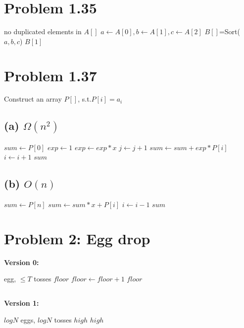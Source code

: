 \documentclass[a4paper]{article}
\begin{document}
\begin{spacing}{1.3}
\begin{multicols}{2}
\section*{Problem 1.35}
\begin{algorithmic}[1]
\ENSURE no duplicated elements in $A[]$
\STATE $a \leftarrow A[0], b\leftarrow A[1], c\leftarrow A[2]$
\STATE $B[]$=Sort($a,b,c$)
\RETURN $B[1]$
\end{algorithmic}

\section*{Problem 1.37}
Construct an array $P[]$, s.t.$P[i]=a_i$
\subsection*{(a) $\Omega(n^2)$}
\begin{algorithmic}[1]
\STATE $sum \gets P[0]$
\STATE $exp \gets 1$
{
\STATE $exp \gets exp*x$
\STATE $j\gets j+1$
\ENDFOR}
\STATE $sum\gets sum+exp*P[i]$
\STATE $i\gets i+1$
\ENDFOR
\RETURN $sum$
\end{algorithmic}

\subsection*{(b) $O(n)$}
\begin{algorithmic}[1]
\STATE $sum \gets P[n]$
\STATE $sum\gets sum*x+P[i]$
\STATE $i\gets i-1$
\ENDFOR
\RETURN $sum$
\end{algorithmic}

\section*{}
\section*{Problem 2: Egg drop}
\textbf{Version 0:}
\begin{algorithmic}[1]
 egg, $\leq T$ tosses
 \RETURN $floor$ \ENDIF
\STATE $floor \gets floor+1$
\ENDFOR
\RETURN $floor$
\end{algorithmic}

\subsection*{}
\textbf{Version 1:}
\begin{algorithmic}[1]
\REQUIRE $logN$ eggs, $logN$ tosses
	\RETURN $high$ \ENDIF
	\ELSE 
	\RETURN $high$ \ENDIF
	\ENDIF
\ENDFOR
\end{algorithmic}


\end{multicols}
\end{spacing}
\end{document}

